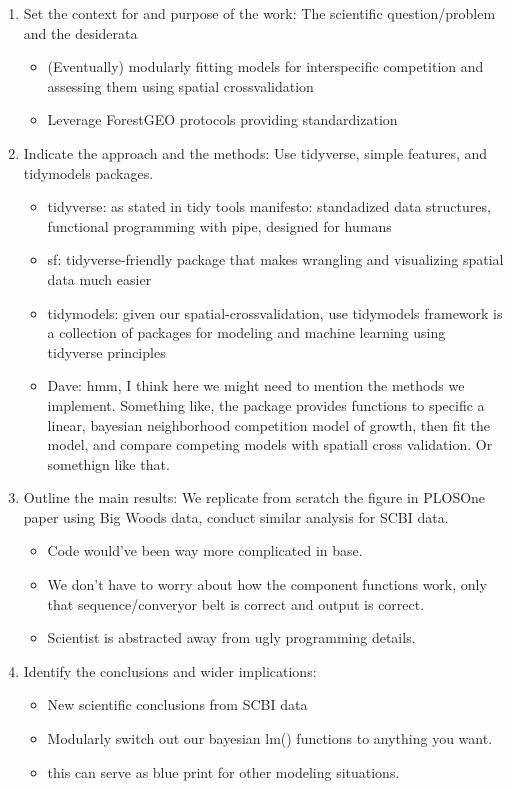 \documentclass[12pt]{article}
\providecommand{\tightlist}{%
  \setlength{\itemsep}{0pt}\setlength{\parskip}{0pt}}
\begin{document}
\begin{enumerate}
\def\labelenumi{\arabic{enumi}.}
\tightlist
\item
  Set the context for and purpose of the work: The scientific
  question/problem and the desiderata

  \begin{itemize}
  \tightlist
  \item
    (Eventually) modularly fitting models for interspecific competition
    and assessing them using spatial crossvalidation
  \item
    Leverage ForestGEO protocols providing standardization
  \end{itemize}
\item
  Indicate the approach and the methods: Use tidyverse, simple features,
  and tidymodels packages.

  \begin{itemize}
  \tightlist
  \item
    tidyverse: as stated in tidy tools manifesto: standadized data
    structures, functional programming with pipe, designed for humans
  \item
    sf: tidyverse-friendly package that makes wrangling and visualizing
    spatial data much easier
  \item
    tidymodels: given our spatial-crossvalidation, use tidymodels
    framework is a collection of packages for modeling and machine
    learning using tidyverse principles
  \item
    Dave: hmm, I think here we might need to mention the methods we
    implement. Something like, the package provides functions to
    specific a linear, bayesian neighborhood competition model of
    growth, then fit the model, and compare competing models with
    spatiall cross validation. Or somethign like that.
  \end{itemize}
\item
  Outline the main results: We replicate from scratch the figure in
  PLOSOne paper using Big Woods data, conduct similar analysis for SCBI
  data.

  \begin{itemize}
  \tightlist
  \item
    Code would've been way more complicated in base.
  \item
    We don't have to worry about how the component functions work, only
    that sequence/converyor belt is correct and output is correct.
  \item
    Scientist is abstracted away from ugly programming details.
  \end{itemize}
\item
  Identify the conclusions and wider implications:

  \begin{itemize}
  \tightlist
  \item
    New scientific conclusions from SCBI data
  \item
    Modularly switch out our bayesian lm() functions to anything you
    want.
  \item
    this can serve as blue print for other modeling situations.
  \end{itemize}
\end{enumerate}
\end{document}
